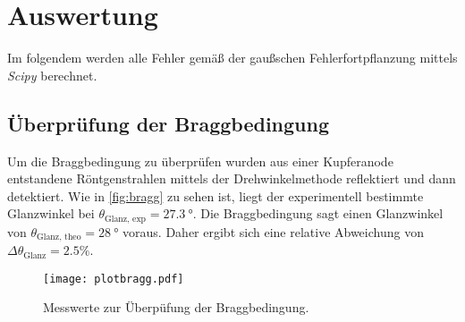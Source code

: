 \section{Auswertung}
\label{sec:Auswertung}
Im folgendem werden alle Fehler gemäß der gaußschen Fehlerfortpflanzung mittels \textit{Scipy}\cite{scipy} berechnet.
\subsection{Überprüfung der Braggbedingung}
\label{subsec:bragg}
Um die Braggbedingung zu überprüfen wurden aus einer Kupferanode entstandene Röntgenstrahlen mittels der Drehwinkelmethode reflektiert und dann detektiert. Wie in 
\autoref{fig:bragg} zu sehen ist, liegt der experimentell bestimmte Glanzwinkel bei $\theta_\text{Glanz, exp} = \qty{27.3}{\degree}$. Die Braggbedingung sagt einen 
Glanzwinkel von $\theta_\text{Glanz, theo} = \qty{28}{\degree}$ voraus. Daher ergibt sich eine relative Abweichung von $\Delta \theta_\text{Glanz} = 2.5\%$.
\begin{figure}
    \centering
    \texttt{[image: plotbragg.pdf]}
    \caption{Messwerte zur Überpüfung der Braggbedingung.}
    \label{fig:bragg}
\end{figure}

